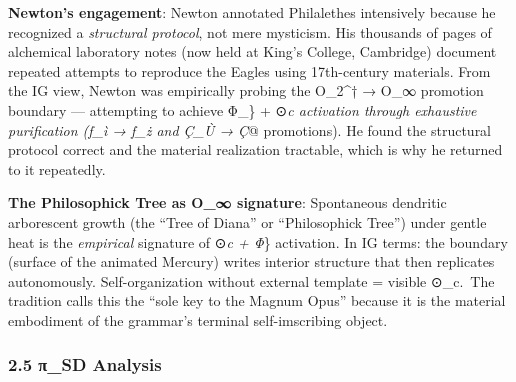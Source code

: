 \textbf{Newton's engagement}: Newton annotated Philalethes intensively
because he recognized a \emph{structural protocol}, not mere mysticism.
His thousands of pages of alchemical laboratory notes (now held at
King's College, Cambridge) document repeated attempts to reproduce the
Eagles using 17th-century materials. From the IG view, Newton was
empirically probing the O\_2\^{}† → O\_∞ promotion boundary ---
attempting to achieve Φ\_\} + ⊙\emph{c activation through exhaustive
purification (ƒ\_ì → ƒ\_ż and Ç\_Ù → Ç}@ promotions). He found the
structural protocol correct and the material realization tractable,
which is why he returned to it repeatedly.

\textbf{The Philosophick Tree as O\_∞ signature}: Spontaneous dendritic
arborescent growth (the ``Tree of Diana'' or ``Philosophick Tree'')
under gentle heat is the \emph{empirical} signature of ⊙\emph{c + Φ}\}
activation. In IG terms: the boundary (surface of the animated Mercury)
writes interior structure that then replicates autonomously.
Self-organization without external template = visible ⊙\_c.~The
tradition calls this the ``sole key to the Magnum Opus'' because it is
the material embodiment of the grammar's terminal self-imscribing
object.

\subsubsection{2.5 π\_SD Analysis}\label{ux3c0_sd-analysis}

